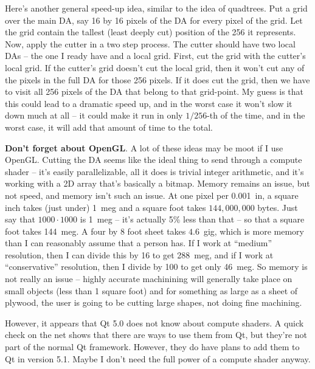 \documentclass[titlepage,oneside,10pt]{article}
\begin{document}
Here's another general speed-up idea, similar to the idea of
quadtrees. Put a grid over the main DA, say 16 by 16 pixels of the DA
for every pixel of the grid. Let the grid contain the tallest (least
deeply cut) position of the 256 it represents. Now, apply the cutter
in a two step process. The cutter should have two local DAs -- the one
I ready have and a local grid. First, cut the grid with the cutter's
local grid. If the cutter's grid doesn't cut the local grid, then it
won't cut any of the pixels in the full DA for those 256 pixels. If it
does cut the grid, then we have to visit all 256 pixels of the DA that
belong to that grid-point. My guess is that this could lead to a
dramatic speed up, and in the worst case it won't slow it down much at
all -- it could make it run in only $1/256$-th of the time, and in the
worst case, it will add that amount of time to the total.

{\bf Don't forget about OpenGL}. A lot of these ideas may be moot if I
use OpenGL. Cutting the DA seems like the ideal thing to send through
a compute shader -- it's easily parallelizable, all it does is trivial
integer arithmetic, and it's working with a 2D array that's basically
a bitmap. Memory remains an issue, but not speed, and memory isn't
such an issue. At one pixel per 0.001~in, a square inch takes (just
under) 1~meg and a square foot takes $144,000,000$ bytes. Just say
that $1000\cdot 1000$ is 1~meg -- it's actually 5\% less than that --
so that a square foot takes 144~meg. A four by 8 foot sheet takes
$4.6$~gig, which is more memory than I can reasonably assume that a
person has. If I work at ``medium'' resolution, then I can divide this
by 16 to get 288~meg, and if I work at ``conservative'' resolution,
then I divide by 100 to get only 46~meg. So memory is not really an
issue -- highly accurate machinining will generally take place on
small objects (less than 1 square foot) and for something as large as
a sheet of plywood, the user is going to be cutting large shapes, not
doing fine machining.

However, it appears that Qt 5.0 does not know about compute
shaders. A quick check on the net shows that there are
ways to use them from Qt, but they're not part of the normal Qt
framework. However, they do have plans to add them to Qt in version
5.1. Maybe I don't need the full power of a compute shader anyway.
\end{document}
